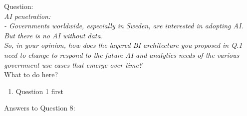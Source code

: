 Question:\\
\emph{
    AI penetration:\\
- Governments worldwide, especially in Sweden, are interested in adopting AI.
But there is no AI without data.\\ So, in your opinion, how does the layered BI
architecture you proposed in Q.1 need to change to respond to the future AI and
analytics needs of the various government use cases that emerge over time?
}\\

What to do here?
\begin{enumerate}
    \item Question 1 first
  \end{enumerate}

Answers to Question 8:

